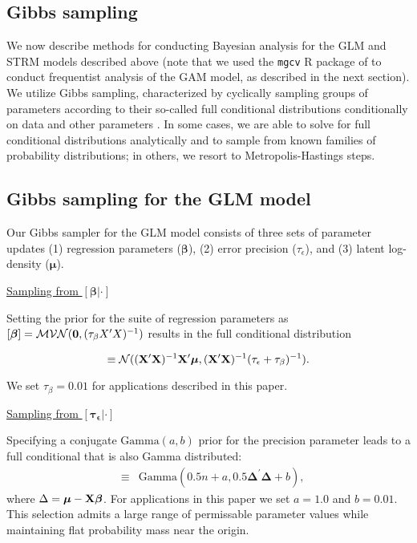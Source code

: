 \documentclass[12pt,fleqn]{article}
\begin{document}
\begin{flushleft}
\section{Gibbs sampling}

We now describe methods for conducting Bayesian analysis for the GLM and STRM models described above (note that we used the \texttt{mgcv} R package of \citet{Wood2006} to conduct frequentist analysis of the GAM model, as described in the next section).  We utilize Gibbs sampling, characterized by cyclically sampling groups of parameters according to their so-called full conditional distributions conditionally on data and other parameters \citep{Gelman2004}.  In some cases, we are able to solve for full conditional distributions analytically and to sample from known families of probability distributions; in others, we resort to Metropolis-Hastings steps.

\subsection{Gibbs sampling for the GLM model}

Our Gibbs sampler for the GLM model consists of three sets of parameter updates (1) regression parameters ($\boldsymbol{\beta}$), (2) error precision ($\tau_\epsilon$), and (3) latent log-density ($\boldsymbol{\mu}$).

\underline{Sampling from $[\boldsymbol{\beta}|\cdot]$}

Setting the prior for the suite of regression parameters as $[\boldsymbol{\beta}] = \mathcal{MVN}({\bf 0},(\tau_\beta X^\prime X)^{-1})$ results in the full conditional distribution
\begin{linenomath*}
\begin{equation*}
   [\boldsymbol{\beta} | \cdot] \equiv \mathcal{N}(({\bf X}^\prime {\bf X})^{-1}{\bf X}^\prime \boldsymbol{\mu},({\bf X}^\prime {\bf X})^{-1} (\tau_\epsilon + \tau_\beta)^{-1}).
\end{equation*}
\end{linenomath*}
We set $\tau_\beta = 0.01$ for applications described in this paper.

\underline{Sampling from $[\boldsymbol{\tau_\epsilon}|\cdot]$}

Specifying a conjugate $\text{Gamma}(a,b)$ prior for the precision parameter leads to a full conditional that is also Gamma distributed:
\begin{eqnarray}
  [\tau_\epsilon | \cdot] & \equiv & \textrm{Gamma}(0.5n + a,0.5 \boldsymbol{\Delta}^\prime \boldsymbol{\Delta} +b),
  \label{eq:tau_eps}
\end{eqnarray}
where $\Delta = \boldsymbol{\mu}-{\bf X}\boldsymbol{\beta}$.  For applications in this paper we set $a=1.0$ and $b=0.01$.  This selection admits a large range of permissable parameter values while maintaining flat probability mass near the origin.


\end{flushleft}
\end{document}
